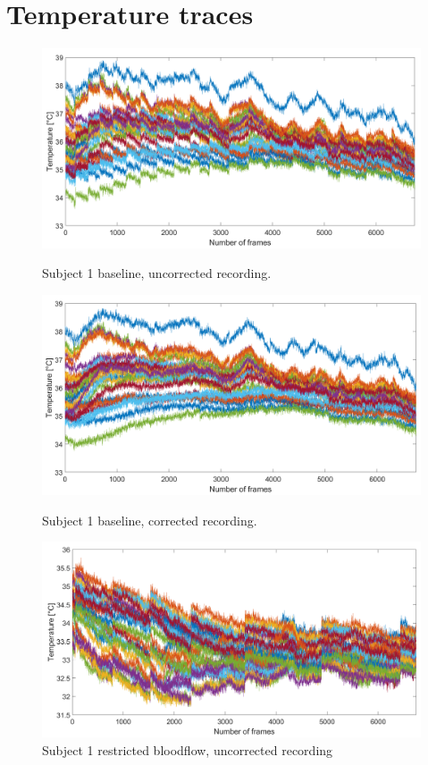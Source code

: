 \chapter{Temperature traces}
\label{ch:AppC}
\begin{figure}[htbp]
	\begin{minipage}[b]{0.45\linewidth}
		\centering
		\includegraphics[width=\linewidth]{figures/Recordings/Sub1_uncuffed_uncorr}
		\caption{Subject 1 baseline, uncorrected recording.}
	
	\end{minipage}
	\hspace{0.2cm}
	\begin{minipage}[b]{0.45\linewidth}
		\centering
		\includegraphics[width=\linewidth]{figures/Recordings/Sub1_uncuffed_corr}
		\caption{Subject 1 baseline, corrected recording.}
	
	\end{minipage}
    \hspace{0.2cm}
	\begin{minipage}[b]{0.45\linewidth}
		\centering
		\includegraphics[width=\linewidth]{figures/Recordings/Sub1_cuffed_uncorr}
		\caption{Subject 1 restricted bloodflow, uncorrected recording}
		

\end{minipage}
\end{figure}
